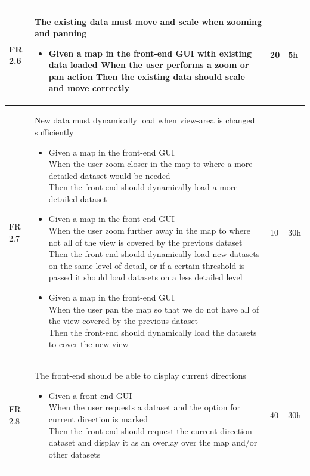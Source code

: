 \documentclass[11pt,a4paper,titlepage,oneside]{report}
\begin{document}
\begin{longtable}{p{1.4cm} p{7.8cm} p{1cm} p{1cm} }
  FR 2.6 & The existing data must move and scale when zooming and panning
  \begin{itemize}
  \item \parbox[t]{6.8cm}{
        Given a map in the \gls{front-end} \gls{GUI} with existing data loaded
        When the user performs a zoom or pan action
        Then the existing data should scale and move correctly}
  \end{itemize}
  & 20 & 5h \\ \hline

  FR 2.7 & New data must dynamically load when view-area is changed sufficiently
  \begin{itemize}
  \item \parbox[t]{6.8cm}{
        Given a map in the \gls{front-end} \gls{GUI} \\
        When the user zoom closer in the map to where a more detailed dataset would be needed \\
        Then the \gls{front-end} should dynamically load a more detailed dataset}
  \item \parbox[t]{6.8cm}{
        Given a map in the \gls{front-end} \gls{GUI} \\
        When the user zoom further away in the map to where not all of the view is covered by the previous dataset \\
        Then the \gls{front-end} should dynamically load new datasets on the same level of detail, or if a certain threshold is passed it should load datasets on a less detailed level}
  \item \parbox[t]{6.8cm}{
        Given a map in the \gls{front-end} \gls{GUI} \\
        When the user pan the map so that we do not have all of the view covered by the previous dataset \\
        Then the \gls{front-end} should dynamically load the datasets to cover the new view}
  \end{itemize}
  & 10 & 30h \\ \hline

  FR 2.8 & The \gls{front-end} should be able to display current directions
  \begin{itemize}
  \item \parbox[t]{6.8cm}{
        Given a \gls{front-end} \gls{GUI} \\
        When the user requests a dataset and the option for current direction is marked \\
        Then the \gls{front-end} should request the current direction dataset and display it as an overlay over the map and/or other datasets}
  \end{itemize}
  & 40 & 30h \\ \hline

  \end{longtable}
\end{document}

